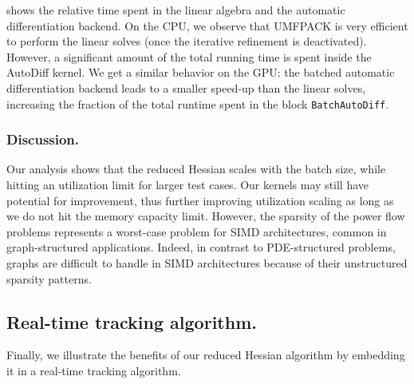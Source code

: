  shows the relative time spent in the linear algebra and the automatic differentiation backend.
On the CPU, we observe that UMFPACK is very efficient to perform the linear solves (once the iterative
refinement is deactivated). However, a significant amount of the total running time is spent inside the AutoDiff
kernel. We get a similar behavior on the GPU: the batched automatic differentiation backend leads
to a smaller speed-up than the linear solves, increasing the fraction of the total runtime
spent in the block {\tt BatchAutoDiff}.

\subsubsection{Discussion.}

Our analysis shows that the reduced Hessian scales with the batch size, while
hitting an utilization limit for larger test cases. Our kernels may still have potential for improvement, thus further improving utilization scaling as long as we do not hit the memory capacity limit.
However, the sparsity of the power flow problems represents a worst-case problem for SIMD architectures, common
in graph-structured applications. Indeed, in contrast to PDE-structured
problems, graphs are difficult to handle in SIMD architectures because
of their unstructured sparsity patterns.


\subsection{Real-time tracking algorithm.}
Finally, we illustrate the benefits of our reduced Hessian algorithm by embedding it in a real-time
tracking algorithm.

